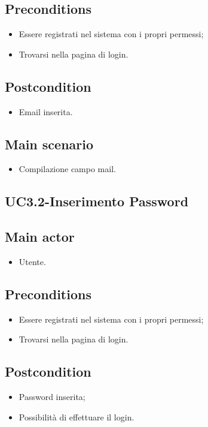 \documentclass{article}
\begin{document}
     \subsection*{Preconditions} 
        \begin{itemize}
            \item Essere registrati nel sistema con i propri permessi;
            \item Trovarsi nella pagina di login.
        \end{itemize}
        \subsection*{Postcondition} 
        \begin{itemize}
            \item Email inserita.
        \end{itemize}
        \subsection*{Main scenario}
        \begin{itemize}
        \item Compilazione campo mail.
        \end{itemize}

\subsection{UC3.2-Inserimento Password}
    
     \subsection*{Main actor}
         \begin{itemize}
             \item Utente.
         \end{itemize}
     \subsection*{Preconditions} 
        \begin{itemize}
            \item Essere registrati nel sistema con i propri permessi;
            \item Trovarsi nella pagina di login.
        \end{itemize}
        \subsection*{Postcondition} 
        \begin{itemize}
            \item Password inserita;
            \item Possibilità di effettuare il login.
        \end{itemize}
\end{document}

